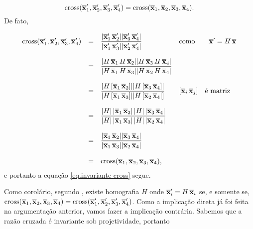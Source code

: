 \begin{equation}\label{eq.invariante-cross}
\text{cross}(\overline{\mathbf{x}}'_1,\overline{\mathbf{x}}'_2,\overline{\mathbf{x}}'_3,\overline{\mathbf{x}}'_4)=\text{cross}(\overline{\mathbf{x}}_1,\overline{\mathbf{x}}_2,\overline{\mathbf{x}}_3,\overline{\mathbf{x}}_4).
\end{equation}
De fato,

\begin{equation*}
\begin{array}{rcll}
\text{cross}(\overline{\mathbf{x}}'_1,\overline{\mathbf{x}}'_2,\overline{\mathbf{x}}'_3,\overline{\mathbf{x}}'_4)&=&\displaystyle\frac{|\overline{\mathbf{x}}'_1\,\overline{\mathbf{x}}'_2||\overline{\mathbf{x}}'_3\,\overline{\mathbf{x}}'_4|}{|\overline{\mathbf{x}}'_1\,\overline{\mathbf{x}}'_3||\overline{\mathbf{x}}'_2\,\overline{\mathbf{x}}'_4|}&\text{como}\qquad\overline{\mathbf{x}}'=H\,\overline{\mathbf{x}}\\\\
&=&
\displaystyle\frac{|H\,\overline{\mathbf{x}}_1\,H\,\overline{\mathbf{x}}_2||H\,\overline{\mathbf{x}}_3\,H\,\overline{\mathbf{x}}_4|}{|H\,\overline{\mathbf{x}}_1\,H\,\overline{\mathbf{x}}_3||H\,\overline{\mathbf{x}}_2\,H\,\overline{\mathbf{x}}_4|}&\\\\
&=&
\displaystyle\frac{|H\,[\overline{\mathbf{x}}_1\,\overline{\mathbf{x}}_2]||H\,[\overline{\mathbf{x}}_3\,\overline{\mathbf{x}}_4]|}{|H\,[\overline{\mathbf{x}}_1\,\overline{\mathbf{x}}_3]||H\,[\overline{\mathbf{x}}_2\,\overline{\mathbf{x}}_4|]}&[\overline{\mathbf{x}}_i\,\overline{\mathbf{x}}_j]\quad\text{é matriz}      \\\\
&=&
\displaystyle\frac{|H|\,|\overline{\mathbf{x}}_1\,\overline{\mathbf{x}}_2|\,|H|\,|\overline{\mathbf{x}}_3\,\overline{\mathbf{x}}_4|}{|H|\,|\overline{\mathbf{x}}_1\,\overline{\mathbf{x}}_3|\,|H|\,|\overline{\mathbf{x}}_2\,\overline{\mathbf{x}}_4|}&\\\\
&=&
\displaystyle\frac{|\overline{\mathbf{x}}_1\,\overline{\mathbf{x}}_2||\overline{\mathbf{x}}_3\,\overline{\mathbf{x}}_4|}{|\overline{\mathbf{x}}_1\,\overline{\mathbf{x}}_3||\overline{\mathbf{x}}_2\,\overline{\mathbf{x}}_4|}&\\\\
&=&
\text{cross}(\overline{\mathbf{x}}_1,\overline{\mathbf{x}}_2,\overline{\mathbf{x}}_3,\overline{\mathbf{x}}_4),
\end{array}
\end{equation*}
e portanto a equação \ref{eq.invariante-cross} segue.

Como corolário, segundo \cite{kneebone}, existe homografia $H$ onde $\overline{\mathbf{x}}'_i=H\,\overline{\mathbf{x}}_i$ se, e somente se, $\text{cross}(\overline{\mathbf{x}}_1,\overline{\mathbf{x}}_2,\overline{\mathbf{x}}_3,\overline{\mathbf{x}}_4)=\text{cross}(\overline{\mathbf{x}}'_1,\overline{\mathbf{x}}'_2,\overline{\mathbf{x}}'_3,\overline{\mathbf{x}}'_4)$. Como a implicação direta já foi feita na argumentação anterior, vamos fazer a implicação contrária. Sabemos que a razão cruzada é invariante sob projetividade, portanto


